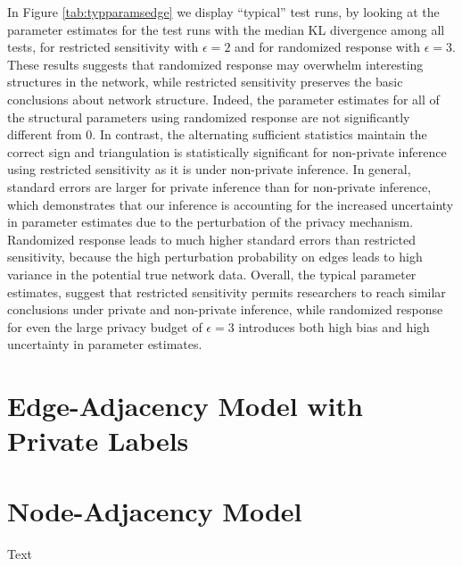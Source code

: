   In Figure \ref{tab:typparamsedge} we display ``typical'' test runs, by looking at the parameter estimates for the test runs with the median KL divergence among all tests, for  restricted sensitivity with $\epsilon=2$ and for randomized response with $\epsilon=3$. These results suggests that randomized response may overwhelm interesting structures in the network, while restricted sensitivity preserves the basic conclusions about network structure. Indeed, the parameter estimates for all of the structural parameters using randomized response are not significantly different from $0$. In contrast, the alternating sufficient statistics maintain the correct sign and triangulation is statistically significant for non-private inference using restricted sensitivity as it is under non-private inference. In general, standard errors are larger for private inference than for non-private inference, which demonstrates that our inference is accounting for the increased uncertainty in parameter estimates due to the perturbation of the privacy mechanism. Randomized response leads to much higher standard errors than restricted sensitivity, because the high perturbation probability on edges leads to high variance in the potential true network data. Overall, the typical parameter estimates, suggest that restricted sensitivity permits researchers to reach similar conclusions under private and non-private inference, while randomized response for even the large privacy budget of $\epsilon=3$ introduces both high bias and high uncertainty in parameter estimates.
 
 
 \section{Edge-Adjacency Model with Private Labels}

 
 \section{Node-Adjacency Model}
 
 Text
 